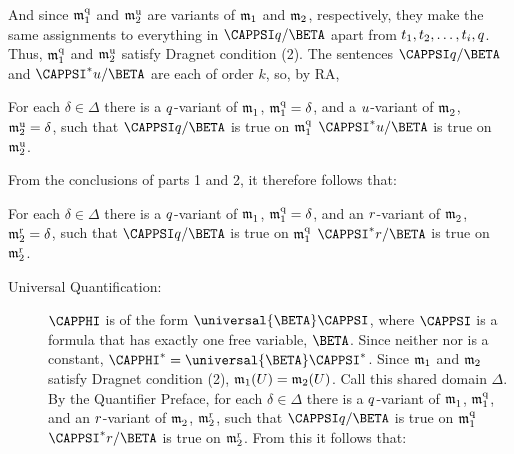\begin{PROOF}
\begin{description}
\begin{description}
\begin{SUBPROOF}
	And since $\mathfrak{m^{\mathrm{q}}_{\mathrm{1}}}$ and $\mathfrak{m^{\mathrm{u}}_{\mathrm{2}}}$ are variants of $\mathfrak{m}_1$ and $\mathfrak{m}_2$, respectively, they make the same assignments to everything in $\CAPPSI\variable{q}/\BETA$ apart from $t_1,t_2,\ldots,t_{i},q$.
	Thus, $\mathfrak{m^{\mathrm{q}}_{\mathrm{1}}}$ and $\mathfrak{m^{\mathrm{u}}_{\mathrm{2}}}$ satisfy Dragnet condition (2).
	The sentences $\CAPPSI\variable{q}/\BETA$ and $\CAPPSI^*\variable{u}/\BETA$ are each of order $k$, so, by RA,
	
	\begin{center}
		For each $\delta\in\Delta$ there is a $q$-variant of $\mathfrak{m^{\mathrm{}}_{\mathrm{1}}}$, $\mathfrak{m^{\mathrm{q}}_{\mathrm{1}}}=\delta$, and a $u$-variant of $\mathfrak{m^{\mathrm{}}_{\mathrm{2}}}$,\\$\mathfrak{m^{\mathrm{u}}_{\mathrm{2}}}=\delta$, such that $\CAPPSI\variable{q}/\BETA$ is true on $\mathfrak{m^{\mathrm{q}}_{\mathrm{1}}}$ \Iff $\CAPPSI^*\variable{u}/\BETA$ is true on $\mathfrak{m^{\mathrm{u}}_{\mathrm{2}}}$.
	\end{center}

	From the conclusions of parts 1 and 2, it therefore follows that:

	\begin{center}
		For each $\delta\in\Delta$ there is a $q$-variant of $\mathfrak{m^{\mathrm{}}_{\mathrm{1}}}$, $\mathfrak{m^{\mathrm{q}}_{\mathrm{1}}}=\delta$, and an $r$-variant of $\mathfrak{m^{\mathrm{}}_{\mathrm{2}}}$,\\$\mathfrak{m^{\mathrm{r}}_{\mathrm{2}}}=\delta$, such that $\CAPPSI\variable{q}/\BETA$ is true on $\mathfrak{m^{\mathrm{q}}_{\mathrm{1}}}$ \Iff $\CAPPSI^*\variable{r}/\BETA$ is true on $\mathfrak{m^{\mathrm{r}}_{\mathrm{2}}}$.
	\end{center}

\end{SUBPROOF}

\begin{description}

	\item[Universal Quantification:] $\CAPPHI$ is of the form $\universal{\BETA}\CAPPSI$, where $\CAPPSI$ is a formula that has exactly one free variable, $\BETA$.
	Since neither \mention{$\forall$} nor \mention{$\BETA$} is a constant, $\CAPPHI^*=\universal{\BETA}\CAPPSI^*$.
	Since $\mathfrak{m}_1$ and $\mathfrak{m}_2$ satisfy Dragnet condition (2), $\mathfrak{m}_1(U)=\mathfrak{m}_2(U)$.
	Call this shared domain $\Delta$.
	By the Quantifier Preface, for each $\delta\in\Delta$ there is a $q$-variant of $\mathfrak{m^{\mathrm{}}_{\mathrm{1}}}$, $\mathfrak{m^{\mathrm{q}}_{\mathrm{1}}}$, and an $r$-variant of $\mathfrak{m^{\mathrm{}}_{\mathrm{2}}}$, $\mathfrak{m^{\mathrm{r}}_{\mathrm{2}}}$, such that $\CAPPSI\variable{q}/\BETA$ is true on $\mathfrak{m^{\mathrm{q}}_{\mathrm{1}}}$ \Iff $\CAPPSI^*\variable{r}/\BETA$ is true on $\mathfrak{m^{\mathrm{r}}_{\mathrm{2}}}$.
	From this it follows that:


\end{description}
\end{description}
\end{description}
\end{PROOF}
